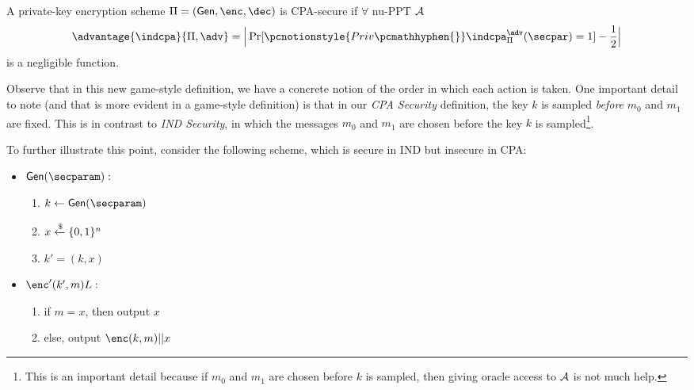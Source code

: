 \begin{definition}
    A private-key encryption scheme $\Pi = (\gen,\enc,\dec)$ is CPA-secure if $\forall$ nu-PPT $\mathcal{A}$
    $$\advantage{\indcpa}{\Pi,\adv} = \Big| \Pr[\pcnotionstyle{Priv\pcmathhyphen{}}\indcpa_\Pi^\adv(\secpar) =1] -\frac12\Big|$$
    is a negligible function.
\end{definition}
Observe that in this new game-style definition, we have a concrete notion of the order in which each action is taken.
One important detail to note (and that is more evident in a game-style definition) is that in our \textit{CPA Security} definition,
the key $k$ is sampled \textit{before} $m_0$ and $m_1$ are fixed.
This is in contrast to \textit{IND Security}, in which the messages $m_0$ and $m_1$ are chosen before the key $k$ is sampled\footnote{This is an important detail because if $m_0$ and $m_1$ are chosen before $k$ is sampled, then giving oracle access to $\mathcal{A}$ is not much help.}.

To further illustrate this point, consider the following scheme, which is secure in IND but insecure in CPA:
\begin{itemize}
    \item $\gen(\secparam):$
    \begin{enumerate}
        \item $k \leftarrow \gen(\secparam)$
        \item $x \xleftarrow{\$} \{0, 1\}^n$
        \item $k' = (k, x)$
    \end{enumerate}
    \item $\enc'(k', m)L:$
    \begin{enumerate}
        \item if $m = x$, then output $x$
        \item else, output $\enc(k,m)||x$
    \end{enumerate}
\end{itemize}



